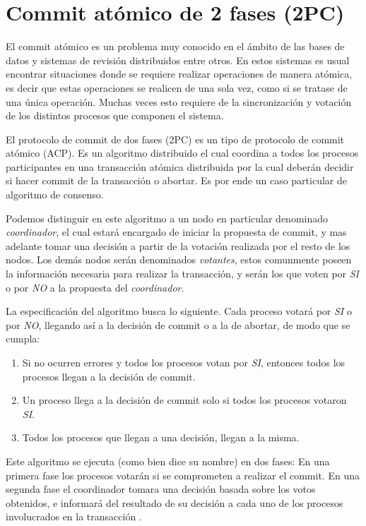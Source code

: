 \documentclass[pdftex,a4paper,12pt]{book}
\begin{document}
\section{Commit at\'omico de 2 fases (2PC)}

El commit at\'omico es un problema muy conocido en el \'ambito de las bases de datos y sistemas de revisi\'on distribuidos entre otros. En estos sistemas es usual encontrar situaciones donde se requiere realizar operaciones de manera at\'omica, es decir que estas operaciones se realicen de una sola vez, como si se tratase de una \'unica operaci\'on. Muchas veces esto requiere de la sincronizaci\'on y votaci\'on de los distintos procesos que componen el sistema.

El protocolo de commit de dos fases (2PC) es un tipo de protocolo de commit at\'omico (ACP). Es un algoritmo distribuido el cual coordina a todos los procesos participantes en una transacci\'on at\'omica distribuida por la cual deber\'an decidir si hacer commit de la transacci\'on o abortar. Es por ende un caso particular de algoritmo de consenso.

Podemos distinguir en este algoritmo a un nodo en particular denominado \textit{coordinador}, el cual estar\'a encargado de iniciar la propuesta de commit, y mas adelante tomar una decisi\'on a partir de la votaci\'on realizada por el resto de los nodos. Los dem\'as nodos ser\'an denominados \textit{votantes}, estos comunmente poseen la informaci\'on necesaria para realizar la transacci\'on, y ser\'an los que voten por \textit{SI} o por \textit{NO} a la propuesta del \textit{coordinador}.

La especificaci\'on del algoritmo busca lo siguiente. Cada proceso votar\'a por \textit{SI} o por \textit{NO}, llegando as\'i a la decisi\'on de commit o a la de abortar, de modo que se cumpla:
\begin{enumerate}
\item Si no ocurren errores y todos los procesos votan por \textit{SI}, entonces todos los procesos llegan a la decisi\'on de commit.
\item Un proceso llega a la decisi\'on de commit solo si todos los procesos votaron \textit{SI}.
\item Todos los procesos que llegan a una decisi\'on, llegan a la misma.
\end{enumerate}

Este algoritmo se ejecuta (como bien dice su nombre) en dos fases: En una primera fase los procesos votar\'an si se comprometen a realizar el commit. En una segunda fase el coordinador tomara una decisi\'on basada sobre los votos obtenidos, e informar\'a del resultado de su decisi\'on a cada uno de los procesos involucrados en la transacci\'on \cite{Arora}.
\end{document}
